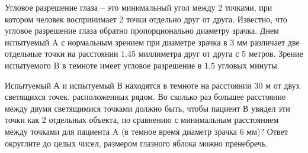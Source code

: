 
Угловое
разрешение глаза – это минимальный угол между 2 точками, при котором человек
воспринимает 2 точки отдельно друг от друга. Известно, что угловое разрешение
глаза обратно пропорционально диаметру зрачка. Днем испытуемый A с нормальным
зрением при диаметре зрачка в $3$  мм различает две отдельные точки на расстоянии
$1.45$  миллиметра друг от друга с $5$  метров. Зрение испытуемого B в темноте имеет
угловое разрешение в $1.5$  угловых минуты. 

Испытуемый А и испытуемый В находятся в темноте на расстоянии
$30$ м от двух светящихся точек, расположенных рядом.  Во сколько раз большее расстояние между двумя
светящимися точками должно быть, чтобы пациент В увидел эти точки как 2
отдельных объекта, по сравнению с минимальным расстоянием между точками для
пациента A (в темное время диаметр зрачка $6$  мм)? Ответ округлите до целых
чисел, размером глазного яблока можно пренебречь.

\explanationSection


